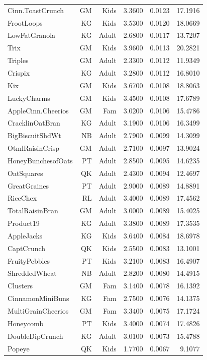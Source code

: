 \begin{longtable}{@{}lrrrrr@{}}
Cinn.ToastCrunch & GM & Kids & 3.3600 & 0.0123 & 17.1916 \\
FrootLoops & KG & Kids & 3.5300 & 0.0120 & 18.0669 \\
LowFatGranola & KG & Adult & 2.6800 & 0.0117 & 13.7207 \\
Trix & GM & Kids & 3.9600 & 0.0113 & 20.2821 \\
Triples & GM & Adult & 2.3300 & 0.0112 & 11.9349 \\
Crispix & KG & Adult & 3.2800 & 0.0112 & 16.8010 \\
Kix & GM & Kids & 3.6700 & 0.0108 & 18.8063 \\
LuckyCharms & GM & Kids & 3.4500 & 0.0108 & 17.6789 \\
AppleCinn.Cheerios & GM & Fam & 3.0200 & 0.0106 & 15.4786 \\
CracklinOatBran & KG & Adult & 3.1900 & 0.0106 & 16.3499 \\
BigBiscuitShdWt & NB & Adult & 2.7900 & 0.0099 & 14.3099 \\
OtmlRaisinCrisp & GM & Adult & 2.7100 & 0.0097 & 13.9024 \\
HoneyBunchesofOats & PT & Adult & 2.8500 & 0.0095 & 14.6235 \\
OatSquares & QK & Adult & 2.4300 & 0.0094 & 12.4697 \\
GreatGraines & PT & Adult & 2.9000 & 0.0089 & 14.8891 \\
RiceChex & RL & Adult & 3.4000 & 0.0089 & 17.4562 \\
TotalRaisinBran & GM & Adult & 3.0000 & 0.0089 & 15.4025 \\
Product19 & KG & Adult & 3.3800 & 0.0089 & 17.3535 \\
AppleJacks & KG & Kids & 3.6400 & 0.0084 & 18.6978 \\
CaptCrunch & QK & Kids & 2.5500 & 0.0083 & 13.1001 \\
FruityPebbles & PT & Kids & 3.2100 & 0.0083 & 16.4907 \\
ShreddedWheat & NB & Adult & 2.8200 & 0.0080 & 14.4915 \\
Clusters & GM & Fam & 3.1400 & 0.0078 & 16.1392 \\
CinnamonMiniBuns & KG & Fam & 2.7500 & 0.0076 & 14.1375 \\
MultiGrainCheerios & GM & Fam & 3.3400 & 0.0075 & 17.1724 \\
Honeycomb & PT & Kids & 3.4000 & 0.0074 & 17.4826 \\
DoubleDipCrunch & KG & Adult & 3.0100 & 0.0073 & 15.4788 \\
Popeye & QK & Kids & 1.7700 & 0.0067 & 9.1077 \\
\bottomrule
\end{longtable}
\endgroup